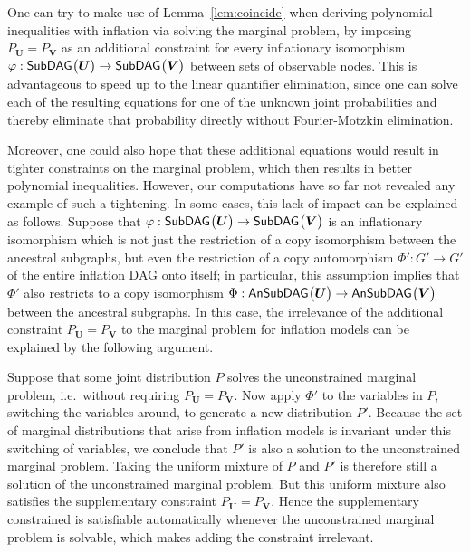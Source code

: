 
One can try to make use of Lemma~\ref{lem:coincide} when deriving polynomial inequalities with inflation via solving the marginal problem, by imposing $P_{\bm{U}} = P_{\bm{V}}$ as an additional constraint for every inflationary isomorphism $\varphi : {\operatorname{\mathsf{SubDAG}}_{}}\bigl\lparen\bm{U}\bigr\rparen\to{\operatorname{\mathsf{SubDAG}}_{}}\bigl\lparen\bm{V}\bigr\rparen$ between sets of observable nodes. This is advantageous to speed up to the linear quantifier elimination, since one can solve each of the resulting equations for one of the unknown joint probabilities and thereby eliminate that probability directly without Fourier-Motzkin elimination.

Moreover, one could also hope that these additional equations would result in tighter constraints on the marginal problem, which then results in better polynomial inequalities. However, our computations have so far not revealed any example of such a tightening. In some cases, this lack of impact can be explained as follows.
Suppose that $\varphi:{\operatorname{\mathsf{SubDAG}}_{}}\bigl\lparen\bm{U}\bigr\rparen\to{\operatorname{\mathsf{SubDAG}}_{}}\bigl\lparen\bm{V}\bigr\rparen$ is an inflationary isomorphism which is not just the restriction of a copy isomorphism between the ancestral subgraphs, but even the restriction of a copy automorphism $\Phi':G'\to G'$ of the entire inflation DAG onto itself; in particular, this assumption implies that $\Phi'$ also restricts to a copy isomorphism $\Phi:{\operatorname{\mathsf{AnSubDAG}}_{}}\bigl\lparen\bm{U}\bigr\rparen\to{\operatorname{\mathsf{AnSubDAG}}_{}}\bigl\lparen\bm{V}\bigr\rparen$ between the ancestral subgraphs. In this case, the irrelevance of the additional constraint $P_{\bm{U}} = P_{\bm{V}}$ to the marginal problem for inflation models can be explained by the following argument. 

Suppose that some joint distribution $P$ solves the unconstrained marginal problem, i.e.~without requiring $P_{\bm{U}} = P_{\bm{V}}$. Now apply $\Phi'$ to the variables in $P$, switching the variables around, to generate a new distribution $P'$. Because the set of marginal distributions that arise from inflation models is invariant under this switching of variables, we conclude that $P'$ is also a solution to the unconstrained marginal problem. Taking the uniform mixture of $P$ and $P'$ is therefore still a solution of the unconstrained marginal problem. But this uniform mixture also satisfies the supplementary constraint $P_{\bm{U}} = P_{\bm{V}}$. Hence the supplementary constrained is satisfiable automatically whenever the unconstrained marginal problem is solvable, which makes adding the constraint irrelevant.

